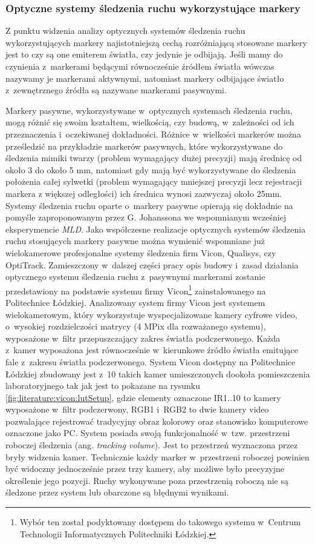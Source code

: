 \subsubsection*{Optyczne systemy śledzenia ruchu wykorzystujące markery}
Z punktu widzenia analizy optycznych systemów śledzenia ruchu wykorzystujących markery najistotniejszą cechą rozróżniającą stosowane markery jest to czy są one emiterem światła, czy jedynie je odbijają. Jeśli mamy do czynienia z~markerami będącymi równocześnie źródłem światła wówczas nazywamy je markerami aktywnymi, natomiast markery odbijające światło z~zewnętrznego źródła są nazywane markerami pasywnymi.

Markery pasywne, wykorzystywane w~optycznych systemach śledzenia ruchu, mogą różnić się swoim kształtem, wielkością, czy budową, w~zależności od ich przeznaczenia i~oczekiwanej dokładności. Różnice w~wielkości markerów można prześledzić na przykładzie markerów pasywnych, które wykorzystywane do śledzenia mimiki twarzy (problem wymagający dużej precyzji) mają średnicę od około 3 do około 5 mm, natomiast gdy mają być wykorzystywane do śledzenia położenia całej sylwetki (problem wymagający mniejszej precyzji lecz rejestracji markera z większej odległości) ich średnica wynosi zazwyczaj około 25mm. Systemy śledzenia ruchu oparte o~markery pasywne opierają się dokładnie na pomyśle zaproponowanym przez G. Johanssona we wspomnianym wcześniej eksperymencie \textsl{MLD}. Jako współczesne realizacje optycznych systemów śledzenia ruchu stosujących markery pasywne można wymienić wspomniane już wielokamerowe profesjonalne systemy śledzenia firm Vicon, Qualisys, czy OptiTrack. 
Zamieszczony w~dalszej części pracy opis budowy i~zasad działania optycznego systemu śledzenia ruchu z~pasywnymi markerami zostanie przedstawiony na podstawie systemu firmy Vicon\footnote{Wybór ten został podyktowany dostępem do takowego systemu w~Centrum Technologii Informatycznych Politechniki Łódzkiej.} zainstalowanego na Politechnice Łódzkiej. 
Analizowany system firmy Vicon jest systemem wielokamerowym, który wykorzystuje wyspecjalizowane kamery cyfrowe video, o~wysokiej rozdzielczości matrycy (4 MPix dla rozważanego systemu), wyposażone w~filtr przepuszczający zakres światła podczerwonego. Każda z~kamer wyposażona jest równocześnie w~kierunkowe źródło światła emitujące fale z~zakresu światła podczerwonego. System Vicon dostępny na Politechnice Łódzkiej zbudowany jest z~10 takich kamer umieszczonych dookoła pomieszczenia laboratoryjnego tak jak jest to pokazane na rysunku \ref{fig:literature:vicon:lutSetup}, gdzie elementy oznaczone IR1..10 to kamery wyposażone w~filtr podczerwony, RGB1 i~RGB2 to dwie kamery video pozwalające rejestrować tradycyjny obraz kolorowy oraz stanowisko komputerowe oznaczone jako PC. System posiada swoją funkcjonalność w~tzw. przestrzeni roboczej śledzenia (ang. \textsl{tracking volume}). Jest to przestrzeń wyznaczona przez bryły widzenia kamer. Technicznie każdy marker w~przestrzeni roboczej powinien być widoczny jednocześnie przez trzy kamery, aby możliwe było precyzyjne określenie jego pozycji. Ruchy wykonywane poza przestrzenią roboczą nie są śledzone przez system lub obarczone są błędnymi wynikami.

